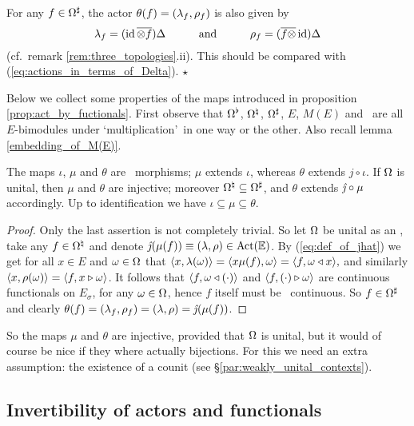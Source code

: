 \begin{remark} \label{rem:theta_and_Delta} \rm
 For any $f\in \Om\adl$, the actor $\theta(f)=\lamrho{f}$ is also given by
 $$ \lam_f = (\id \,\overline{\tens f})\Delta    \andspace{3em}
    \rho_f = (\overline{f \tens} \,\id)\Delta   $$
 (cf.\ remark \ref{rem:three_topologies}.ii).
 This should be compared with (\ref{eq:actions_in_terms_of_Delta}).
 \hfill $\star$
\end{remark}

Below we collect some properties of the maps introduced in proposition
\ref{prop:act_by_fuctionals}\@.
First observe that $\Om\wdl$, $\Om\mdl$, $\Om\adl$, $E$, $M(E)$ and \ActE\
are all $E$-bimodules under \lq multiplication\rq\ in one way or the other.
Also recall lemma \ref{embedding_of_M(E)}\@.

\begin{cor} \label{cor:act_by_fuctionals}
  The maps $\iota$, $\mu$ and $\theta$ are \Ebimod\ morphisms;
  $\mu$ extends $\iota$, whereas $\theta$ extends $j\circ\iota$.
  If $\Om$ is unital, then $\mu$ and $\theta$ are injective;
  moreover $\Om\mdl \subseteq \Om\adl$, and $\theta$ extends $\jhat\circ\mu$ accordingly.
  Up to identification we have $\iota \subseteq \mu \subseteq \theta$.
\end{cor}
%
\begin{proof}
  Only the last assertion is not completely trivial.
  So let $\Om$ be unital as an \Ebimod, take any $f\in \Om\mdl$ and denote
  $\jhat(\mu(f))\equiv (\lam,\rho) \in \ActE$.
  By (\ref{eq:def_of_jhat}) we get for all $x\in E$ and $\om\in\Om$ that
  $\pair{x}{\lam(\om)} = \pair{x\mu(f)}{\om} = \pair{f}{\om \ract x},$
  and similarly $\pair{x}{\rho(\om)} = \pair{f}{x \lact \om}$.
  It follows that $\pair{f}{\om \ract (\cdot)}$ and
  $\pair{f}{(\cdot) \lact \om}$ are continuous functionals on $E_\sigma$,
  for any $\om\in\Om$, hence $f$ itself must be \stricta\ continuous.
  So $f\in\Om\adl$ and clearly
  $\theta(f)=\lamrho{f}=(\lam,\rho)=\jhat(\mu(f))$.
\end{proof}
\vspace{2ex}

So the maps $\mu$ and $\theta$ are injective, provided that $\Om$ is unital,
but it would of course be nice if they where actually bijections.
For this we need an extra assumption: the existence of a counit
(see \S \ref{par:weakly_unital_contexts}).




\subsection{Invertibility of actors and functionals}

